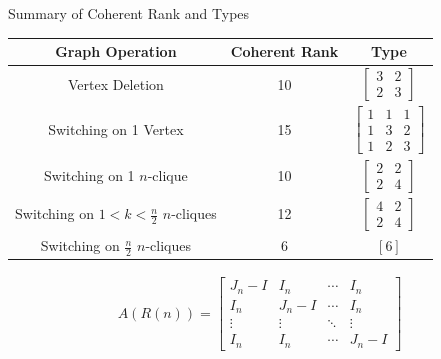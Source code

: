\documentclass{beamer}
\begin{document}
\begin{frame}{Summary of Coherent Rank and Types}
\centering
\begin{tabular}{|c|c|c|}
\hline
\textbf{Graph Operation} & \textbf{Coherent Rank} & \textbf{Type} \\
\hline
Vertex Deletion & 10 & $\begin{bmatrix} 3 & 2 \\ 2 & 3 \end{bmatrix}$ \\
\hline
Switching on 1 Vertex & 15 & 
$\begin{bmatrix}
1 & 1 & 1 \\
1 & 3 & 2 \\
1 & 2 & 3
\end{bmatrix}$ \\
\hline
Switching on 1 $n$-clique & 10 & 
$\begin{bmatrix}
2 & 2 \\
2 & 4
\end{bmatrix}$ \\
\hline
Switching on $1<k<\frac{n}{2}$ $n$-cliques & 12 & 
$\begin{bmatrix}
4 & 2 \\
2 & 4
\end{bmatrix}$ \\
\hline
Switching on $\frac{n}{2}$ $n$-cliques & 6 & $[6]$ \\
\hline
\end{tabular}

\[
\begin{aligned}
    A(R(n)) = 
    \left[
        \begin{array}{cccc}
        J_{n} - I & I_n & \cdots & I_n \\
        I_n & J_n - I & \cdots & I_n \\
        \vdots & \vdots & \ddots & \vdots \\
        I_n & I_n & \cdots & J_n - I
        \end{array}
    \right]
\end{aligned}
\]
\end{frame}
\end{document}
